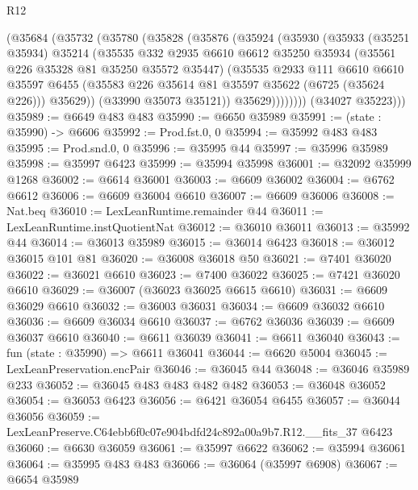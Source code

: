 \begin{lexlean}{R12}
\begin{coremodule}
          (@35684
            (@35732
              (@35780
                (@35828
                  (@35876
                    (@35924
                      (@35930
                        (@35933
                          (@35251 @35934)
                          @35214
                          (@35535
                            @332
                            @2935
                            @6610
                            @6612
                            @35250
                            @35934
                            (@35561 @226 @35328 @81 @35250 @35572 @35447)
                            (@35535
                              @2933
                              @111
                              @6610
                              @6610
                              @35597
                              @6455
                              (@35583 @226 @35614 @81 @35597 @35622 (@6725 (@35624 @226)))
                              @35629))
                          (@33990 @35073 @35121))
                        @35629))))))))
        (@34027 @35223)))
@35989 := @6649 @483 @483
@35990 := @6650 @35989
@35991 := (state : @35990) -> @6606
@35992 := Prod.fst.{0, 0}
@35994 := @35992 @483 @483
@35995 := Prod.snd.{0, 0}
@35996 := @35995 @44
@35997 := @35996 @35989
@35998 := @35997 @6423
@35999 := @35994 @35998
@36001 := @32092 @35999 @1268
@36002 := @6614 @36001
@36003 := @6609 @36002
@36004 := @6762 @6612
@36006 := @6609 @36004 @6610
@36007 := @6609 @36006
@36008 := Nat.beq
@36010 := LexLeanRuntime.remainder @44
@36011 := LexLeanRuntime.instQuotientNat
@36012 := @36010 @36011
@36013 := @35992 @44
@36014 := @36013 @35989
@36015 := @36014 @6423
@36018 := @36012 @36015 @101 @81
@36020 := @36008 @36018 @50
@36021 := @7401 @36020
@36022 := @36021 @6610
@36023 := @7400 @36022
@36025 := @7421 @36020 @6610
@36029 := @36007 (@36023 @36025 @6615 @6610)
@36031 := @6609 @36029 @6610
@36032 := @36003 @36031
@36034 := @6609 @36032 @6610
@36036 := @6609 @36034 @6610
@36037 := @6762 @36036
@36039 := @6609 @36037 @6610
@36040 := @6611 @36039
@36041 := @6611 @36040
@36043 := fun (state : @35990) => @6611 @36041
@36044 := @6620 @5004
@36045 := LexLeanPreservation.encPair
@36046 := @36045 @44
@36048 := @36046 @35989 @233
@36052 := @36045 @483 @483 @482 @482
@36053 := @36048 @36052
@36054 := @36053 @6423
@36056 := @6421 @36054 @6455
@36057 := @36044 @36056
@36059 := LexLeanPreserve.C64ebb6f0c07e904bdfd24c892a00a9b7.R12.__fits_37 @6423
@36060 := @6630 @36059
@36061 := @35997 @6622
@36062 := @35994 @36061
@36064 := @35995 @483 @483
@36066 := @36064 (@35997 @6908)
@36067 := @6654 @35989

\end{coremodule}
\end{lexlean}

